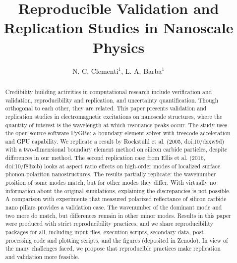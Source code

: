 \documentclass{rstransa} %
\begin{document}
\title{Reproducible Validation and Replication Studies in Nanoscale Physics}

\author{%
N. C. Clementi$^{1}$, L. A. Barba$^{1}$}

\address{$^{1}$Department of Mechanical and Aerospace Engineering, 
The George Washington University, Washington D.C., USA }

\subject{computer modeling and simulation, computational physics}



\begin{abstract}
    Credibility building activities in computational research include
    verification and validation, reproducibility and replication, and
    uncertainty quantification. Though orthogonal to each other, they are
    related. This paper presents validation and replication studies in 
    electromagnetic excitations on nanoscale structures, where the quantity
    of interest is the wavelength at which resonance peaks occur. 
    The study uses the open-source software PyGBe: a boundary element
    solver with treecode acceleration and GPU capability.
    We replicate a result by Rockstuhl et al. (2005, doi:10/dsxw9d) with a
    two-dimensional boundary element method on silicon carbide particles,
    despite differences in our method. 
    The second replication case from Ellis et al. (2016, doi:10/f83zcb) looks
    at aspect ratio effects on high-order modes of localized surface phonon-polariton
    nanostructures. The results partially replicate: the wavenumber
    position of some modes match, but for other modes they differ.
    With virtually no information about the original simulations, 
    explaining the discrepancies is not possible. 
    A comparison with experiments that measured polarized reflectance 
    of silicon carbide nano pillars provides a validation case.
    The wavenumber of the dominant mode and two more do match, but 
    differences remain in other minor modes. 
    Results in this paper were produced with strict reproducibility
    practices, and we share reproducibility packages for all, including
    input files, execution scripts, secondary data, post-processing code and
    plotting scripts, and the figures (deposited in Zenodo).
    In view of the many challenges faced, we propose that reproducible
    practices make replication and validation more feasible.

    \end{abstract}
    
\end{document}
